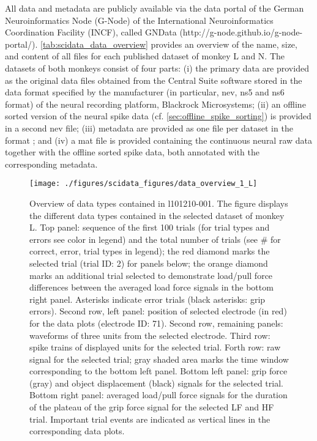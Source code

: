 {All data and metadata are publicly available via the data portal of the German Neuroinformatics Node (G-Node) of the International Neuroinformatics Coordination Facility (INCF), called GNData (http://g-node.github.io/g-node-portal/). \cref{tab:scidata_data_overview} provides an overview of the name, size, and content of all files for each published dataset of monkey L and N. The datasets of both monkeys consist of four parts: (i) the primary data are provided as the original data files obtained from the Central Suite software stored in the data format specified by the manufacturer (in particular, nev, ns5 and ns6 format) of the neural recording platform, Blackrock Microsystems; (ii) an offline sorted version of the neural spike data (cf. \cref{sec:offline_spike_sorting}) is provided in a second nev file; (iii) metadata are provided as one file per dataset in the  format \citep{Grewe_2011, Zehl_2016}; and (iv) a mat file is provided containing the continuous neural raw data together with the offline sorted spike data, both annotated with the corresponding metadata.

\begin{figure}
 \centering
 \texttt{[image: ./figures/scidata\_figures/data\_overview\_1\_L]}
 \caption[Overview of data types contained in l101210-001]{Overview of data types contained in l101210-001. The figure displays the different data types contained in the selected dataset of monkey L. Top panel: sequence of the first 100 trials (for trial types and errors see color in legend) and the total number of trials (see \# for correct, error, trial types in legend); the red diamond marks the selected trial (trial ID: 2) for panels below; the orange diamond marks an additional trial selected to demonstrate load/pull force differences between the averaged load force signals in the bottom right panel. Asterisks indicate error trials (black asterisks: grip errors). Second row, left panel: position of selected electrode (in red) for the data plots (electrode ID: 71). Second row, remaining panels: waveforms of three units from the selected electrode. Third row: spike trains of displayed units for the selected trial. Forth row: raw signal for the selected trial; gray shaded area marks the time window corresponding to the bottom left panel. Bottom left panel: grip force (gray) and object displacement (black) signals for the selected trial. Bottom right panel: averaged load/pull force signals for the duration of the plateau of the grip force signal for the selected LF and HF trial. Important trial events are indicated as vertical lines in the corresponding data plots.}
 \label{fig:overview_data_l_1}
\end{figure}

}
